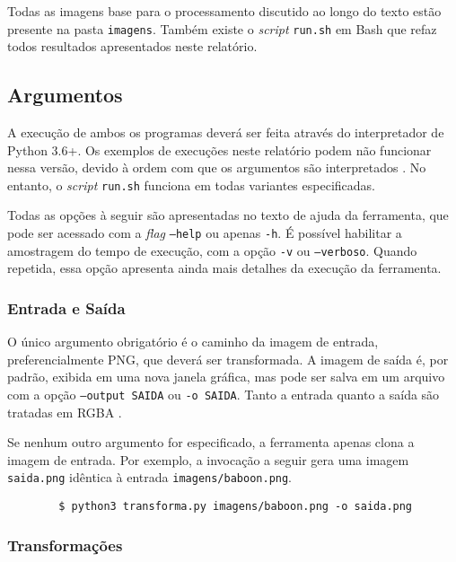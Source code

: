     Todas as imagens base para o processamento discutido ao longo do texto estão presente na pasta \texttt{imagens}. Também existe o \textit{script} \texttt{run.sh} em Bash que refaz todos resultados apresentados neste relatório.

\subsection{Argumentos}

    A execução de ambos os programas deverá ser feita através do interpretador de Python 3.6+. Os exemplos de execuções neste relatório podem não funcionar nessa versão, devido à ordem com que os argumentos são interpretados \autocite{intermixed}. No entanto, o \textit{script} \texttt{run.sh} funciona em todas variantes especificadas.

    Todas as opções à seguir são apresentadas no texto de ajuda da ferramenta, que pode ser acessado com a \textit{flag} \texttt{--help} ou apenas \texttt{-h}. É possível habilitar a amostragem do tempo de execução, com a opção \texttt{-v} ou \texttt{--verboso}. Quando repetida, essa opção apresenta ainda mais detalhes da execução da ferramenta.

\subsubsection{Entrada e Saída}

    O único argumento obrigatório é o caminho da imagem de entrada, preferencialmente PNG, que deverá ser transformada. A imagem de saída é, por padrão, exibida em uma nova janela gráfica, mas pode ser salva em um arquivo com a opção \texttt{--output SAIDA} ou \texttt{-o SAIDA}. Tanto a entrada quanto a saída são tratadas em RGBA \autocite{alphach}.

    Se nenhum outro argumento for especificado, a ferramenta apenas clona a imagem de entrada. Por exemplo, a invocação a seguir gera uma imagem \texttt{saida.png} idêntica à entrada \texttt{imagens/baboon.png}.

    \begin{verbatim}
        $ python3 transforma.py imagens/baboon.png -o saida.png
    \end{verbatim}

\subsubsection{Transformações}

